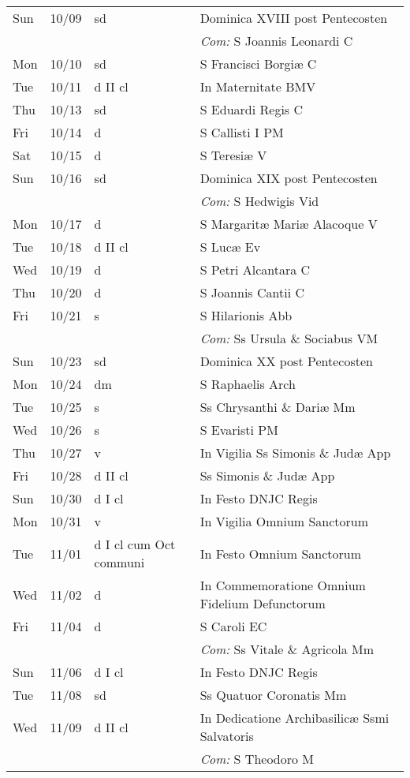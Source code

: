 \documentclass[10pt]{article}
\begin{document}
\begin{longtable}{ l l l l }
Sun & 10/09 & sd & Dominica XVIII post Pentecosten\\
 & & & \textit{Com:} S Joannis Leonardi C\\
Mon & 10/10 & sd & S Francisci Borgiæ C\\
Tue & 10/11 & d II cl & In Maternitate BMV\\
Thu & 10/13 & sd & S Eduardi Regis C\\
Fri & 10/14 & d & S Callisti I PM\\
Sat & 10/15 & d & S Teresiæ V\\
Sun & 10/16 & sd & Dominica XIX post Pentecosten\\
 & & & \textit{Com:} S Hedwigis Vid\\
Mon & 10/17 & d & S Margaritæ Mariæ Alacoque V\\
Tue & 10/18 & d II cl & S Lucæ Ev\\
Wed & 10/19 & d & S Petri Alcantara C\\
Thu & 10/20 & d & S Joannis Cantii C\\
Fri & 10/21 & s & S Hilarionis Abb\\
 & & & \textit{Com:} Ss Ursula \& Sociabus VM\\
Sun & 10/23 & sd & Dominica XX post Pentecosten\\
Mon & 10/24 & dm & S Raphaelis Arch\\
Tue & 10/25 & s & Ss Chrysanthi \& Dariæ Mm\\
Wed & 10/26 & s & S Evaristi PM\\
Thu & 10/27 & v & In Vigilia Ss Simonis \& Judæ App\\
Fri & 10/28 & d II cl & Ss Simonis \& Judæ App\\
Sun & 10/30 & d I cl & In Festo DNJC Regis\\
Mon & 10/31 & v & In Vigilia Omnium Sanctorum\\
Tue & 11/01 & d I cl cum Oct communi & In Festo Omnium Sanctorum\\
Wed & 11/02 & d & In Commemoratione Omnium Fidelium Defunctorum\\
Fri & 11/04 & d & S Caroli EC\\
 & & & \textit{Com:} Ss Vitale \& Agricola Mm\\
Sun & 11/06 & d I cl & In Festo DNJC Regis\\
Tue & 11/08 & sd & Ss Quatuor Coronatis Mm\\
Wed & 11/09 & d II cl & In Dedicatione Archibasilicæ Ssmi Salvatoris\\
 & & & \textit{Com:} S Theodoro M\\

\end{longtable}
\end{document}
